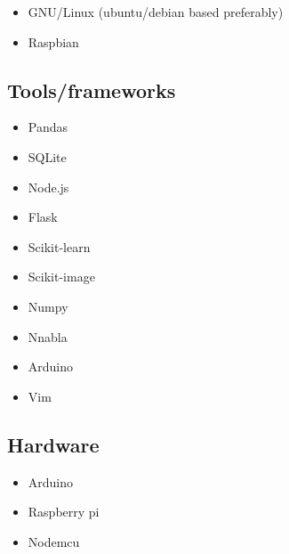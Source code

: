 \begin{itemize}
\tightlist
\item
  GNU/Linux (ubuntu/debian based preferably)
\item
  Raspbian
\end{itemize}

\subsection{Tools/frameworks}\label{toolsframeworks}

\begin{itemize}
\tightlist
\item
  Pandas
\item
  SQLite
\item
  Node.js
\item
  Flask
\item
  Scikit-learn
\item
  Scikit-image
\item
  Numpy
\item
  Nnabla
\item
  Arduino
\item
  Vim
\end{itemize}

\subsection{Hardware}\label{hardware}

\begin{itemize}
\tightlist
\item
  Arduino
\item
  Raspberry pi
\item
  Nodemcu
\end{itemize}
